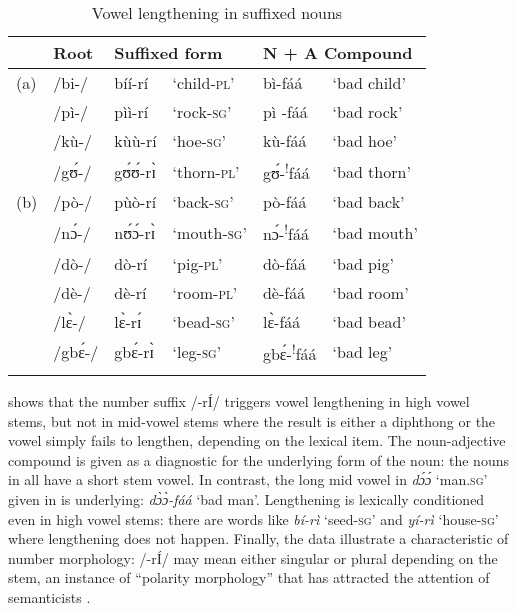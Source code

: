 \documentclass[output=paper
,newtxmath
,modfonts
,nonflat]{langsci/langscibook}
\begin{document}
\begin{table}
\begin{tabularx}{\textwidth}{lXlXlX}
\lsptoprule
& {Root} & \multicolumn{2}{l}{{Suffixed form}} & \multicolumn{2}{l}{{N + A Compound}} \\
\midrule
(a) & /bi-/ & bíí-rí & ‘child-\textsc{pl’} & bì-fáá & ‘bad child’\\
& /pì-/ & pìì-rí & ‘rock-\textsc{sg’} & pì -fáá & ‘bad rock’\\
& /kù-/ & kùù-rí & ‘hoe-\textsc{sg}’ & kù-fáá & ‘bad hoe’\\
& /gʊ́-/ & gʊ́ʊ́-rɪ̀ & ‘thorn-\textsc{pl’} & gʊ́-\textsuperscript{!}fáá & ‘bad thorn’\\
(b) & /pò-/ & pùò-rí & ‘back-\textsc{sg}’ & pò-fáá & ‘bad back’\\
& /nɔ́-/ & nʊ́ɔ́-rɪ̀ & ‘mouth-\textsc{sg}’ & nɔ́-\textsuperscript{!}fáá & ‘bad mouth’\\
& /dò-/ & dò-rí & ‘pig-\textsc{pl}’ & dò-fáá & ‘bad pig’\\
& /dè-/ & dè-rí & ‘room-\textsc{pl}’ & dè-fáá & ‘bad room’\\
& /lɛ̀-/ & lɛ̀-rɪ́ & ‘bead-\textsc{sg}’ & lɛ̀-fáá & ‘bad bead’\\
& /gbɛ́-/ & gbɛ́-rɪ̀ & ‘leg-\textsc{sg}’ & gbɛ́-\textsuperscript{!}fáá & ‘bad leg’\\
\lspbottomrule
\end{tabularx}
\caption{Vowel lengthening in suffixed nouns}
\label{tab:anttila:3} 
\end{table}


\break
{ shows that the number suffix /-rÍ/ triggers vowel}{ lengthening} {i}{n high vowel stems}{, but not in mid-vowel stems where the result is either a diphthong or the vowel simply fails to lengthen, depending on the lexical item. The noun-adjective compound is given as a diagnostic for the underlying form of the noun: the nouns in  all have a short stem vowel. In contrast, the} {long mid vowel} {in} {\textit{dɔ́ɔ́}}{ ‘man.}{\textsc{sg}}{’ given in  is underlying:} {\textit{dɔ̀ɔ̀-}}{\textit{fáá}}{ ‘bad man’.} {Lengthening is lexically conditioned even in high vowel stems: there are words like} {\textit{bí-rì}}{ ‘seed-}{\textsc{sg’}}{ and} {\textit{yí-rì}}{ ‘house-}{\textsc{sg}}{’ where lengthening does not happen. Finally,} {the data illustrate a characteristic}{  of  number morphology: /-r}{Í}{/ may mean either singular or plural depending on the stem, an instance of “polarity morphology” that has attracted the attention of semanticists \citep{Grimm2012}.} 
\end{document}
